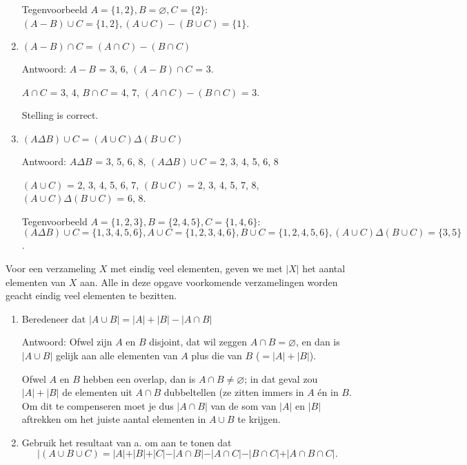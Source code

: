 \begin{answer}
\begin{enumerate}[label=\textit{\alph*.}]
    Tegenvoorbeeld $A=\{1,2\}, B=\varnothing, C=\{2\}$: $(A-B)\cup C=\{1,2\}, (A\cup C)-(B\cup C)=\{1\}$.
    \item $(A-B)\cap C=(A\cap C)-(B\cap C)$
    
    Antwoord: $A-B$ = 3, 6, $(A-B)\cap C$ = 3.
    
    $A\cap C$ = 3, 4, $B\cap C$ = 4, 7, $(A\cap C)-(B\cap C)$ = 3.
    
    Stelling is correct.
    \item $(A\Delta B)\cup C=(A\cup C)\Delta(B\cup C)$
    
    Antwoord: $A\Delta B$ = 3, 5, 6, 8, $(A\Delta B)\cup C$ = 2, 3, 4, 5, 6, 8
    
    $(A\cup C)$ = 2, 3, 4, 5, 6, 7, $(B\cup C)$ = 2, 3, 4, 5, 7, 8, $(A\cup C)\Delta(B\cup C)$ = 6, 8.
    
    Tegenvoorbeeld $A=\{1,2,3\}, B=\{2,4,5\}, C=\{1,4,6\}$: $(A\Delta B)\cup C = \{1, 3, 4, 5, 6\}, A \cup C = \{1,2,3,4,6\}, B\cup C = \{1,2,4,5,6\}, (A\cup C)\Delta(B\cup C) = \{ 3, 5\}$.
\end{enumerate}
\end{answer}

\begin{answer} %
Voor een verzameling $X$ met eindig veel elementen, geven we met $|X|$ het aantal elementen van $X$ aan. Alle in deze opgave voorkomende verzamelingen worden geacht eindig veel elementen te bezitten.
\begin{enumerate}[label=\textit{\alph*.}]
    \item Beredeneer dat $|A\cup B|=|A| + |B| - |A\cap B|$
    
    Antwoord: Ofwel zijn $A$ en $B$ disjoint, dat wil zeggen $A\cap B=\varnothing$, en dan is $|A\cup B|$ gelijk aan alle elementen van $A$ plus die van $B$ ($=|A|+|B|$). 
    
    Ofwel $A$ en $B$ hebben een overlap, dan is $A\cap B\not=\varnothing$; in dat geval zou $|A|+|B|$ de elementen uit $A\cap B$ dubbeltellen (ze zitten immers in $A$ \'en in $B$. Om dit te compenseren moet je dus $|A\cap B|$ van de som van $|A|$ en $|B|$ aftrekken om het juiste aantal elementen in $A\cup B$ te krijgen.
    \item Gebruik het resultaat van a. om aan te tonen dat
    $$|(A\cup B\cup C)=|A|+|B|+|C|-|A\cap B|-|A\cap C|-|B\cap C|+|A\cap B\cap C|.$$
    
\end{enumerate}
\end{answer}


